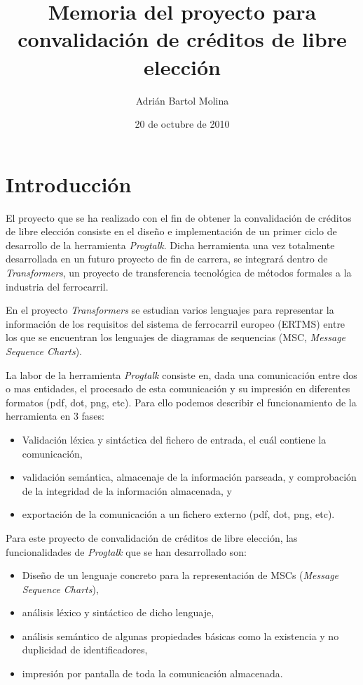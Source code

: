 \documentclass{article}
\title{Memoria del proyecto para convalidación de créditos de libre elección}
\author{Adrián Bartol Molina}
\date{20 de octubre de 2010}
\begin{document}
\begin{titlepage}
\maketitle
\end{titlepage}


\section{Introducción}

El proyecto que se ha realizado con el fin de obtener la convalidación de créditos de libre elección consiste en el diseño e implementación de un primer ciclo de desarrollo de la herramienta \textit{Progtalk}. Dicha herramienta una vez totalmente desarrollada en un futuro proyecto de fin de carrera, se integrará dentro de \emph{Transformers}, un proyecto de transferencia tecnológica de métodos formales a la industria del ferrocarril.

En el proyecto \emph{Transformers} se estudian varios lenguajes para representar la información de los requisitos del sistema de ferrocarril europeo (ERTMS) entre los que se encuentran los lenguajes de diagramas de sequencias (MSC, \emph{Message Sequence Charts}).

La labor de la herramienta \textit{Progtalk} consiste en, dada una comunicación entre dos o mas entidades, el procesado de esta comunicación y su impresión en diferentes formatos (pdf, dot, png, etc). Para ello podemos describir el funcionamiento de la herramienta en 3 fases:

\begin{itemize}
\item Validación léxica y sintáctica del fichero de entrada, el cuál contiene la comunicación,
\item validación semántica, almacenaje de la información parseada, y comprobación de la integridad de la información almacenada, y
\item exportación de la comunicación a un fichero externo (pdf, dot, png, etc).
\end{itemize}

Para este proyecto de convalidación de créditos de libre elección, las funcionalidades de \textit{Progtalk} que se han desarrollado son:

\begin{itemize}
\item Diseño de un lenguaje concreto para la representación de MSCs (\emph{Message Sequence Charts}),
\item análisis léxico y sintáctico de dicho lenguaje,
\item análisis semántico de algunas propiedades básicas como la existencia y no duplicidad de identificadores,
\item impresión por pantalla de toda la comunicación almacenada.
\end{itemize}
\end{document}
